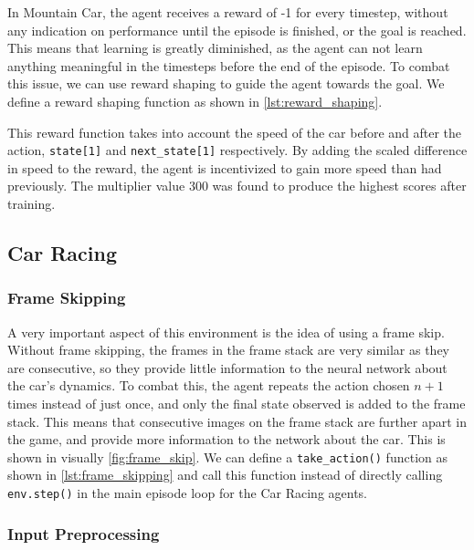 In Mountain Car, the agent receives a reward of -1 for every timestep, without
any indication on performance until the episode is finished, or the goal is
reached. This means that learning is greatly diminished, as the agent can not
learn anything meaningful in the timesteps before the end of the episode. To
combat this issue, we can use reward shaping to guide the agent towards the
goal. We define a reward shaping function as shown in
\autoref{lst:reward_shaping}.



This reward function takes into account the speed of the car before and after
the action, \lstinline{state[1]} and \lstinline{next_state[1]} respectively. By
adding the scaled difference in speed to the reward, the agent is incentivized
to gain more speed than had previously. The multiplier value 300 was found to
produce the highest scores after training.

\subsection{Car Racing}

\subsubsection{Frame Skipping}

A very important aspect of this environment is the idea of using a frame skip.
Without frame skipping, the frames in the frame stack are very similar as they
are consecutive, so they provide little information to the neural network about
the car's dynamics. To combat this, the agent repeats the action chosen $n + 1$
times instead of just once, and only the final state observed is added to the
frame stack. This means that consecutive images on the frame stack are further
apart in the game, and provide more information to the network about the car.
This is shown in visually \autoref{fig:frame_skip}. We can define a
\mbox{\lstinline{take_action()}} function as shown in \autoref{lst:frame_skipping}
and call this function instead of directly calling \lstinline{env.step()} in
the main episode loop for the Car Racing agents.



\newpage



\subsubsection{Input Preprocessing}

